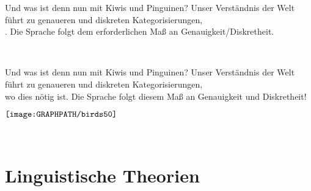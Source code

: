 \ifdefined\HANDOUT
  \begin{frame}
    {Und was ist denn nun mit Kiwis und Pinguinen?}
    \onslide<+->
    \onslide<+->
    Unser Verständnis der Welt führt zu genaueren und diskreten Kategorisierungen,\\
    . \alert{Die Sprache folgt dem erforderlichen Maß an Genauigkeit\slash Diskretheit.}\\
    \Zeile
    \onslide<+->
    \centering
    \\
    \Halbzeile
  \end{frame}
\else
  \begin{frame}
    {Und was ist denn nun mit Kiwis und Pinguinen?}
    \onslide<+->
    \onslide<+->
    Unser Verständnis der Welt führt zu genaueren und diskreten Kategorisierungen,\\
    wo dies nötig ist. \alert{Die Sprache folgt diesem Maß an Genauigkeit und Diskretheit!}\\
    \Zeile
    \onslide<+->
    \centering
    \begin{minipage}{0.9\textwidth}
    \centering
      $\vcenter{\hbox{\texttt{[image: \\GRAPHPATH/birds50]}}}$\hspace{0.1\textwidth}
    \end{minipage}\\
  \end{frame}
\fi


\section{Linguistische Theorien}

